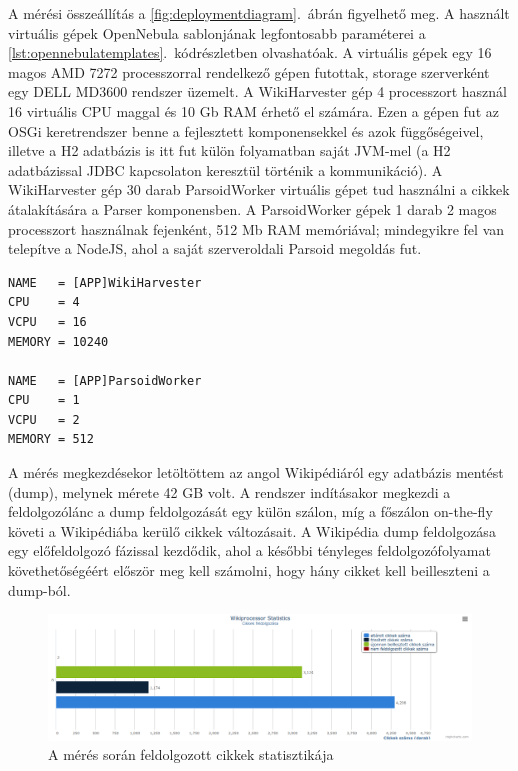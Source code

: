 A mérési összeállítás a \ref{fig:deploymentdiagram}.~ábrán figyelhető meg. A használt virtuális gépek OpenNebula sablonjának legfontosabb paraméterei a \ref{lst:opennebulatemplates}.~kódrészletben olvashatóak. A virtuális gépek egy 16 magos AMD 7272 processzorral rendelkező gépen futottak, storage szerverként egy DELL MD3600 rendszer üzemelt. A WikiHarvester gép 4 processzort használ 16 virtuális CPU maggal és 10 Gb RAM érhető el számára. Ezen a gépen fut az OSGi keretrendszer benne a fejlesztett komponensekkel és azok függőségeivel, illetve a H2 adatbázis is itt fut külön folyamatban saját JVM-mel (a H2 adatbázissal JDBC kapcsolaton keresztül történik a kommunikáció). A WikiHarvester gép 30 darab ParsoidWorker virtuális gépet tud használni a cikkek átalakítására a Parser komponensben. A ParsoidWorker gépek 1 darab 2 magos processzort használnak fejenként, 512 Mb RAM memóriával; mindegyikre fel van telepítve a NodeJS, ahol a saját szerveroldali Parsoid megoldás fut.

\begin{lstlisting}[label={lst:opennebulatemplates}, caption=Részlet a használt VM-ek sablonjából,breaklines=true]
NAME   = [APP]WikiHarvester
CPU    = 4
VCPU   = 16
MEMORY = 10240

NAME   = [APP]ParsoidWorker
CPU    = 1
VCPU   = 2
MEMORY = 512
\end{lstlisting}

A mérés megkezdésekor letöltöttem az angol Wikipédiáról egy adatbázis mentést (dump), melynek mérete 42 GB volt. A rendszer indításakor megkezdi a feldolgozólánc a dump feldolgozását egy külön szálon, míg a főszálon on-the-fly követi a Wikipédiába kerülő cikkek változásait. A Wikipédia dump feldolgozása egy előfeldolgozó fázissal kezdődik, ahol a későbbi tényleges feldolgozófolyamat követhetőségéért először meg kell számolni, hogy hány cikket kell beilleszteni a dump-ból. 

\begin{figure}[htp]
\centering
\includegraphics[scale=0.3]{img/storedarticles}
\caption{A mérés során feldolgozott cikkek statisztikája}
\label{fig:storedarticles}
\end{figure}

